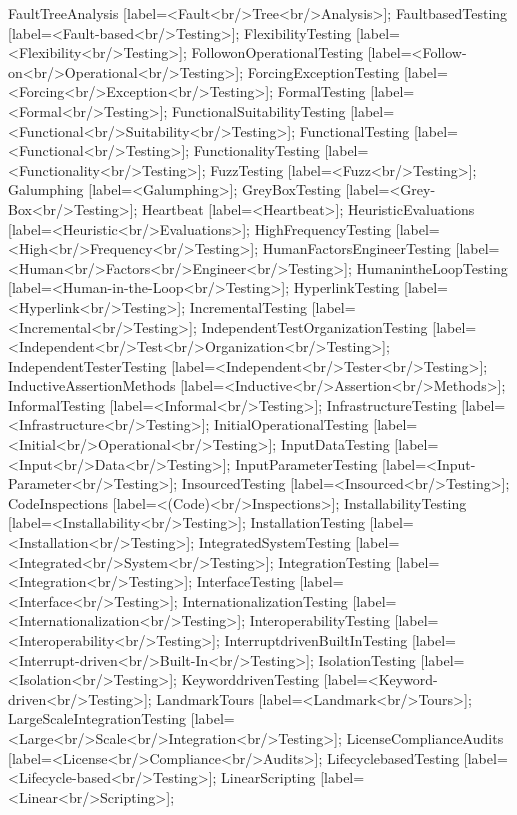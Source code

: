 \documentclass{article}
\begin{document}
{FaultTreeAnalysis [label=<Fault<br/>Tree<br/>Analysis>];
FaultbasedTesting [label=<Fault-based<br/>Testing>];
FlexibilityTesting [label=<Flexibility<br/>Testing>];
FollowonOperationalTesting [label=<Follow-on<br/>Operational<br/>Testing>];
ForcingExceptionTesting [label=<Forcing<br/>Exception<br/>Testing>];
FormalTesting [label=<Formal<br/>Testing>];
FunctionalSuitabilityTesting [label=<Functional<br/>Suitability<br/>Testing>];
FunctionalTesting [label=<Functional<br/>Testing>];
FunctionalityTesting [label=<Functionality<br/>Testing>];
FuzzTesting [label=<Fuzz<br/>Testing>];
Galumphing [label=<Galumphing>];
GreyBoxTesting [label=<Grey-Box<br/>Testing>];
Heartbeat [label=<Heartbeat>];
HeuristicEvaluations [label=<Heuristic<br/>Evaluations>];
HighFrequencyTesting [label=<High<br/>Frequency<br/>Testing>];
HumanFactorsEngineerTesting [label=<Human<br/>Factors<br/>Engineer<br/>Testing>];
HumanintheLoopTesting [label=<Human-in-the-Loop<br/>Testing>];
HyperlinkTesting [label=<Hyperlink<br/>Testing>];
IncrementalTesting [label=<Incremental<br/>Testing>];
IndependentTestOrganizationTesting [label=<Independent<br/>Test<br/>Organization<br/>Testing>];
IndependentTesterTesting [label=<Independent<br/>Tester<br/>Testing>];
InductiveAssertionMethods [label=<Inductive<br/>Assertion<br/>Methods>];
InformalTesting [label=<Informal<br/>Testing>];
InfrastructureTesting [label=<Infrastructure<br/>Testing>];
InitialOperationalTesting [label=<Initial<br/>Operational<br/>Testing>];
InputDataTesting [label=<Input<br/>Data<br/>Testing>];
InputParameterTesting [label=<Input-Parameter<br/>Testing>];
InsourcedTesting [label=<Insourced<br/>Testing>];
CodeInspections [label=<(Code)<br/>Inspections>];
InstallabilityTesting [label=<Installability<br/>Testing>];
InstallationTesting [label=<Installation<br/>Testing>];
IntegratedSystemTesting [label=<Integrated<br/>System<br/>Testing>];
IntegrationTesting [label=<Integration<br/>Testing>];
InterfaceTesting [label=<Interface<br/>Testing>];
InternationalizationTesting [label=<Internationalization<br/>Testing>];
InteroperabilityTesting [label=<Interoperability<br/>Testing>];
InterruptdrivenBuiltInTesting [label=<Interrupt-driven<br/>Built-In<br/>Testing>];
IsolationTesting [label=<Isolation<br/>Testing>];
KeyworddrivenTesting [label=<Keyword-driven<br/>Testing>];
LandmarkTours [label=<Landmark<br/>Tours>];
LargeScaleIntegrationTesting [label=<Large<br/>Scale<br/>Integration<br/>Testing>];
LicenseComplianceAudits [label=<License<br/>Compliance<br/>Audits>];
LifecyclebasedTesting [label=<Lifecycle-based<br/>Testing>];
LinearScripting [label=<Linear<br/>Scripting>];
}
\end{document}
